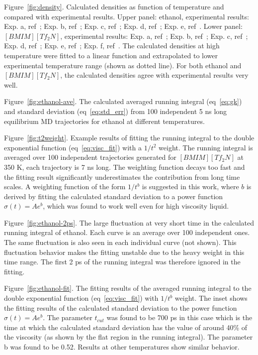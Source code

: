 \documentclass[12pt]{article}
\begin{document}
Figure~\ref{fig:density}.
Calculated densities as function of temperature and compared with experimental results.
Upper panel: ethanol, 
experimental results: 
Exp. a, ref~\cite{Jouyban.KJCE.29.812.2012};
Exp. b, ref~\cite{Bhuiyan.JML.138.139.2008};
Exp. c, ref~\cite{Fonseca.JCED.52.1240.2007};
Exp. d, ref~\cite{Taboas.JCED.51.940.2006};
Exp. e, ref~\cite{Tojo.JCED.49.1590.2004}.
Lower panel: $[BMIM][Tf_2N]$,
experimental results: 
Exp. a, ref~\cite{Gadzuric.JCED.57.1072.2012};
Exp. b, ref~\cite{Katsuta.JCED.55.1588.2010};
Exp. c, ref~\cite{Watanabe.JPCB.110.19593.2006};
Exp. d, ref~\cite{Majer.GC.8.172.2006};
Exp. e, ref~\cite{Heintz.JCED.53.596.2008};
Exp. f, ref~\cite{Husson.JCED.52.2204.2007}.
The calculated densities at high temperature were fitted to a linear function and extrapolated to lower experimental temperature range
(shown as dotted line).
For both ethanol and $[BMIM][Tf_2N]$,
the calculated densities agree with experimental results very well.


Figure~\ref{fig:ethanol-ave}.
The calculated averaged running integral (eq~\ref{eq:gk})
and standard deviation (eq~\ref{eq:std_err}) 
from 100 independent 5 ns long equilibrium MD trajectories for ethanol at different temperatures.

Figure~\ref{fig:t2weight}.
Example results of fitting the running integral to the double exponential function (eq~\ref{eq:visc_fit}) with a $1/t^2$ weight.
The running integral is averaged over 100 independent trajectories generated for $[BMIM][Tf_2N]$ at 350 K,
each trajectory is 7 ns long.
The weighting function decays too fast and the fitting result significantly underestimates the contribution from long time scales.
A weighting function of the form $1/t^b$ is suggested in this work,
where $b$ is derived by fitting the calculated standard deviation to a power function $\sigma(t) = Ae^b$,
which was found to work well even for high viscosity liquid.

Figure~\ref{fig:ethanol-2ps}.
The large fluctuation at very short time in the calculated running integral of ethanol.
Each curve is an average over 100 independent ones.
The same fluctuation is also seen in each individual curve (not shown).
This fluctuation behavior makes the fitting unstable due to the heavy weight in this time range.
The first 2 ps of the running integral was therefore ignored in the fitting.

Figure~\ref{fig:ethanol-fit}.
The fitting results of the averaged running integral to the double exponential function (eq~\ref{eq:visc_fit}) with $1/t^b$ weight.
The inset shows the fitting results of the calculated standard deviation to the power function $\sigma(t) = Ae^b$.
The parameter $t_{cut}$ was found to be 700 ps in this case
which is the time at which the calculated standard deviation has the value of around 40\% of the viscosity 
(as shown by the flat region in the running integral).
The parameter b was found to be 0.52.
Results at other temperatures show similar behavior.
\end{document}
